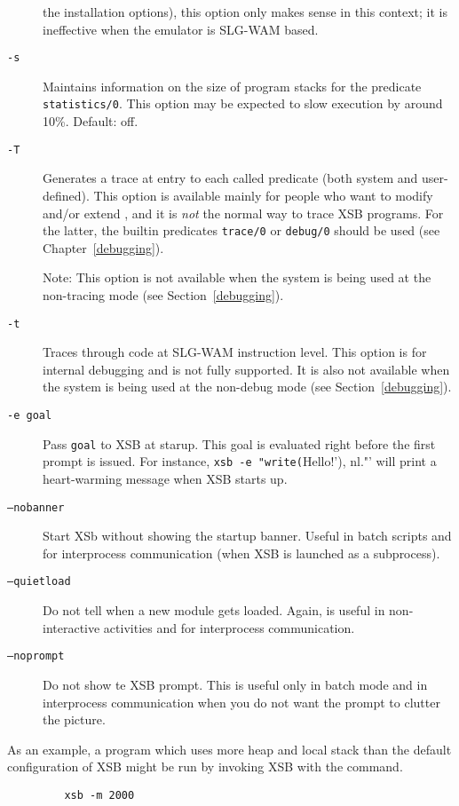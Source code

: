 \begin{description}
    the installation options), this option only makes sense in this
    context; it is ineffective when the emulator is SLG-WAM based.
\item[{\tt -s}] Maintains information on the size of program stacks 
    for the predicate {\tt statistics/0}.  This option may be expected
    to slow execution by around 10\%.  Default: off.
\item[{\tt -T}] Generates a trace at entry to each called predicate
    (both system and user-defined).  This option is available mainly
    for people who want to modify and/or extend \ourprolog, and it is
    {\em not\/} the normal way to trace XSB programs.  For the
    latter, the builtin predicates {\tt trace/0} or {\tt debug/0}
    should be used (see Chapter~\ref{debugging}).

    Note: This option is not available when the system is being used
    at the non-tracing mode (see Section~\ref{debugging}).
\item[{\tt -t}] Traces through code at SLG-WAM instruction level.  This
    option is for internal debugging and is not fully supported.
    It is also not available when the system is being used at the non-debug
    mode (see Section~\ref{debugging}).
\item[{\tt -e goal}] Pass {\tt goal}  to XSB at starup. This goal is evaluated
    right before the first prompt is issued. For instance, 
    \verb'xsb -e "write('Hello!'), nl."'
    will print a heart-warming message when XSB starts up.
  \item[{\tt --nobanner}] Start XSb without showing the startup banner.
    Useful in batch scripts and for interprocess communication (when XSB is
    launched as a subprocess).
  \item[{\tt --quietload}] Do not tell when a new module gets loaded. Again, is
    useful in non-interactive activities and for interprocess communication.
  \item[{\tt --noprompt}] Do not show te XSB prompt. This is useful only in batch
    mode and in interprocess communication when you do not want the prompt
    to clutter the picture.
\end{description}

As an example, a program which uses more heap and local stack than the
default configuration of XSB might be run by invoking XSB with the command.
\begin{verbatim}
         xsb -m 2000
\end{verbatim}



